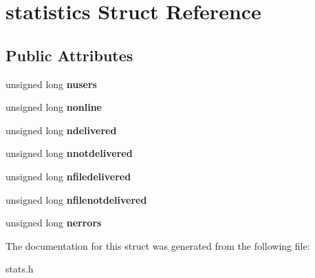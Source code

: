 \hypertarget{structstatistics}{}\section{statistics Struct Reference}
\label{structstatistics}
\subsection*{Public Attributes}
\begin{DoxyCompactItemize}
\item 
\mbox{\label{structstatistics_a390a45ca74cf019667fcf33848a33d13}} 
unsigned long {\bfseries nusers}
\item 
\mbox{\label{structstatistics_afe88b6c92f8cc91e152216167f2b6046}} 
unsigned long {\bfseries nonline}
\item 
\mbox{\label{structstatistics_ac09e24f0d5aa3c8255f734ff040f998e}} 
unsigned long {\bfseries ndelivered}
\item 
\mbox{\label{structstatistics_a7d8cbe9fc73479a941714316b48ffd48}} 
unsigned long {\bfseries nnotdelivered}
\item 
\mbox{\label{structstatistics_a87279336813cee36c18e6299606b1dd8}} 
unsigned long {\bfseries nfiledelivered}
\item 
\mbox{\label{structstatistics_a82667eb0d0b1a45917193e9e1d6d463a}} 
unsigned long {\bfseries nfilenotdelivered}
\item 
\mbox{\label{structstatistics_a893b0a0d9f1fe9a6b9cf61d1f020f265}} 
unsigned long {\bfseries nerrors}
\end{DoxyCompactItemize}


The documentation for this struct was generated from the following file\+:\begin{DoxyCompactItemize}
\item 
stats.\+h\end{DoxyCompactItemize}
